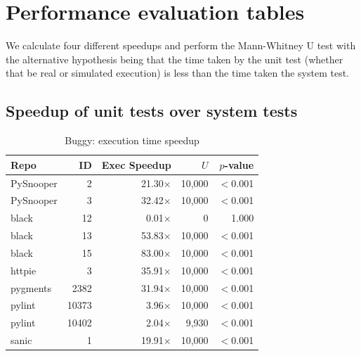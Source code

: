 \chapter{Performance evaluation tables}

We calculate four different speedups and perform the Mann-Whitney U test with the alternative hypothesis
being that the time taken by the unit test (whether that be real or simulated execution) is less
than the time taken the system test.

\label{sec:speedup-data}
\section{Speedup of unit tests over system tests}

\begin{table}[htbp]
    \centering
    \caption{Buggy: execution time speedup}
    \label{tab:buggy_exec}
    \small
    \renewcommand{\arraystretch}{1.2}
    \begin{tabularx}{\linewidth}{@{} >{\raggedright\arraybackslash}X r r r r @{}}
        \toprule
        \textbf{Repo} & \textbf{ID} & \textbf{Exec Speedup} & \textbf{$U$} & \textbf{$p$-value} \\
        \midrule
        PySnooper     & 2           & 21.30$\times$         & 10,000       & $<$0.001           \\
        PySnooper     & 3           & 32.42$\times$         & 10,000       & $<$0.001           \\
        black         & 12          & 0.01$\times$          & 0            & 1.000              \\
        black         & 13          & 53.83$\times$         & 10,000       & $<$0.001           \\
        black         & 15          & 83.00$\times$         & 10,000       & $<$0.001           \\
        httpie        & 3           & 35.91$\times$         & 10,000       & $<$0.001           \\
        pygments      & 2382        & 31.94$\times$         & 10,000       & $<$0.001           \\
        pylint        & 10373       & 3.96$\times$          & 10,000       & $<$0.001           \\
        pylint        & 10402       & 2.04$\times$          & 9,930        & $<$0.001           \\
        sanic         & 1           & 19.91$\times$         & 10,000       & $<$0.001           \\

\end{tabularx}
\end{table}
